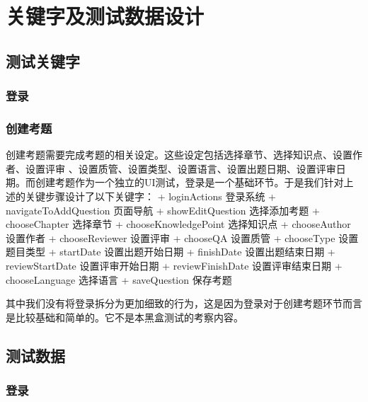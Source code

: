 \documentclass[hyperref, a4paper]{ctexart}
\begin{document}
\hypertarget{ux5173ux952eux5b57ux53caux6d4bux8bd5ux6570ux636eux8bbeux8ba1}{%
\section{关键字及测试数据设计}\label{ux5173ux952eux5b57ux53caux6d4bux8bd5ux6570ux636eux8bbeux8ba1}}

\hypertarget{ux6d4bux8bd5ux5173ux952eux5b57}{%
\subsection{测试关键字}\label{ux6d4bux8bd5ux5173ux952eux5b57}}

\hypertarget{ux767bux5f55}{%
\subsubsection{登录}\label{ux767bux5f55}}

\hypertarget{ux521bux5efaux8003ux9898}{%
\subsubsection{创建考题}\label{ux521bux5efaux8003ux9898}}

创建考题需要完成考题的相关设定。这些设定包括选择章节、选择知识点、设置作者、设置评审
、设置质管、设置类型、设置语言、设置出题日期、设置评审日期。而创建考题作为一个独立的UI测试，登录是一个基础环节。于是我们针对上述的关键步骤设计了以下关键字：
+ loginActions 登录系统 + navigateToAddQuestion 页面导航 +
showEditQuestion 选择添加考题 + chooseChapter 选择章节 +
chooseKnowledgePoint 选择知识点 + chooseAuthor 设置作者 + chooseReviewer
设置评审 + chooseQA 设置质管 + chooseType 设置题目类型 + startDate
设置出题开始日期 + finishDate 设置出题结束日期 + reviewStartDate
设置评审开始日期 + reviewFinishDate 设置评审结束日期 + chooseLanguage
选择语言 + saveQuestion 保存考题

其中我们没有将登录拆分为更加细致的行为，这是因为登录对于创建考题环节而言是比较基础和简单的。它不是本黑盒测试的考察内容。

\hypertarget{ux6d4bux8bd5ux6570ux636e}{%
\subsection{测试数据}\label{ux6d4bux8bd5ux6570ux636e}}

\hypertarget{ux767bux5f55-1}{%
\subsubsection{登录}\label{ux767bux5f55-1}}
\end{document}
